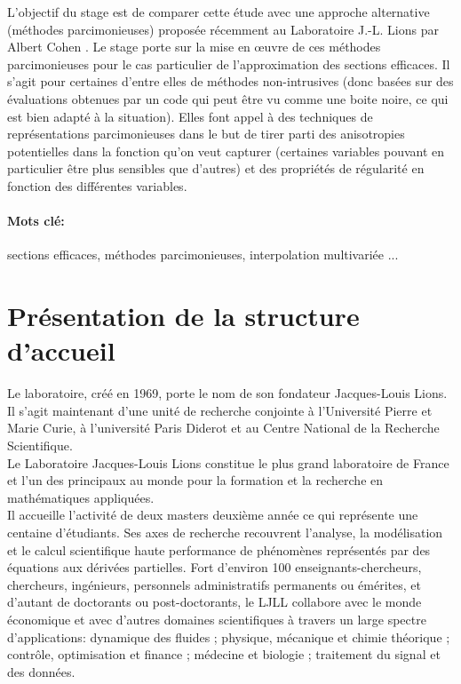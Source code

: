 L’objectif du stage est de comparer cette étude avec une approche alternative (méthodes parcimonieuses) proposée récemment au Laboratoire J.-L. Lions par Albert Cohen \cite{Albert}. Le stage porte sur la mise en œuvre de ces méthodes parcimonieuses pour le cas particulier de l’approximation des sections efficaces. Il s’agit pour certaines d’entre elles de méthodes non-intrusives (donc basées sur des évaluations obtenues par un code qui peut être vu comme une boite noire, ce qui est bien adapté à la situation). Elles font appel à des techniques de représentations parcimonieuses dans le but de tirer parti des anisotropies potentielles dans la fonction qu’on veut capturer (certaines variables pouvant en particulier être plus sensibles que d’autres) et des propriétés de régularité en fonction des différentes variables. \\

\paragraph{Mots clé:} sections efficaces, méthodes parcimonieuses, interpolation multivariée ...

\newpage
\section{Présentation de la structure d’accueil}\label{sec:2}
\hspace{0.5cm}
Le laboratoire, créé en 1969, porte le nom de son fondateur Jacques-Louis Lions. Il s’agit maintenant d’une unité de recherche conjointe à l’Université Pierre et Marie Curie, à l’université Paris Diderot et au Centre National de la Recherche Scientifique. \\

Le Laboratoire Jacques-Louis Lions constitue le plus grand laboratoire de France et l’un des principaux au monde pour la formation et la recherche en mathématiques appliquées. \\

Il accueille l’activité de deux masters deuxième année ce qui représente une centaine d’étudiants. Ses axes de recherche recouvrent l’analyse, la modélisation et le calcul scientifique haute performance de phénomènes représentés par des équations aux dérivées partielles.
Fort d’environ 100 enseignants-chercheurs, chercheurs, ingénieurs, personnels administratifs permanents ou émérites, et d’autant de doctorants ou post-doctorants, le LJLL collabore avec le monde économique et avec d’autres domaines scientifiques à travers un large spectre d'applications: dynamique des fluides ; physique, mécanique et chimie théorique ; contrôle, optimisation et finance ; médecine et biologie ; traitement du signal et des données.

